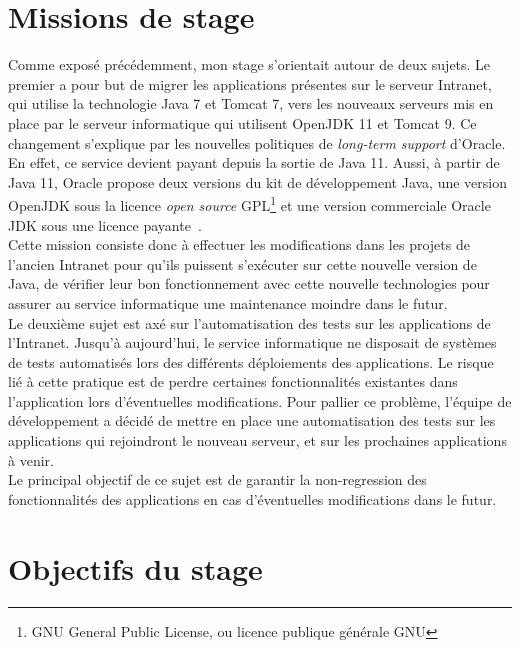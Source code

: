 \section{Missions de stage}
Comme exposé précédemment, mon stage s'orientait autour de deux sujets. Le premier a pour but de migrer les applications présentes sur le serveur Intranet, qui utilise la technologie Java 7 et Tomcat 7, vers les nouveaux serveurs mis en place par le serveur informatique qui utilisent OpenJDK 11 et Tomcat 9. Ce changement s'explique par les nouvelles politiques de \emph{long-term support} d'Oracle. En effet, ce service devient payant depuis la sortie de Java 11. Aussi, à partir de Java 11, Oracle propose deux versions du kit de développement Java, une version OpenJDK sous la licence \emph{open source} GPL\footnote{GNU General Public License, ou licence publique générale GNU} et une version commerciale Oracle JDK sous une licence payante~\cite{JAVA11}. \\

Cette mission consiste donc à effectuer les modifications dans les projets de l'ancien Intranet pour qu'ils puissent s'exécuter sur cette nouvelle version de Java, de vérifier leur bon fonctionnement avec cette nouvelle technologies pour assurer au service informatique une maintenance moindre dans le futur. \\

Le deuxième sujet est axé sur l'automatisation des tests sur les applications de l'Intranet. Jusqu'à aujourd'hui, le service informatique ne disposait de systèmes de tests automatisés lors des différents déploiements des applications. Le risque lié à cette pratique est de perdre certaines fonctionnalités existantes dans l'application lors d'éventuelles modifications. Pour pallier ce problème, l'équipe de développement a décidé de mettre en place une automatisation des tests sur les applications qui rejoindront le nouveau serveur, et sur les prochaines applications à venir.\\

Le principal objectif de ce sujet est de garantir la non-regression des fonctionnalités des applications en cas d'éventuelles modifications dans le futur.

\section{Objectifs du stage}
